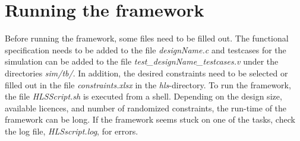 \section{\label{sec:runframework}Running the framework}
Before running the framework, some files need to be filled out. The functional specification needs to be added to the file \textit{designName.c} and testcases for the simulation can be added to the file \textit{test\_designName\_testcases.v} under the directories \textit{sim/tb/}. In addition, the desired constraints need to be selected or filled out in the file \textit{constraints.xlsx} in the \textit{hls}-directory. To run the framework, the file \textit{HLSScript.sh} is executed from a shell. Depending on the design size, available licences, and number of randomized constraints, the run-time of the framework can be long. If the framework seems stuck on one of the tasks, check the log file, \textit{HLSscript.log}, for errors.


